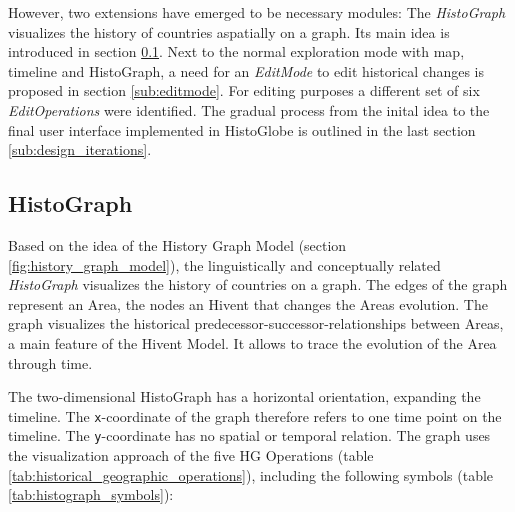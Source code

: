 However, two extensions have emerged to be necessary modules: The \emph{HistoGraph} visualizes the history of countries aspatially on a graph. Its main idea is introduced in section \ref{sub:histograph}. Next to the normal exploration mode with map, timeline and HistoGraph, a need for an \emph{EditMode} to edit historical changes is proposed in section \ref{sub:editmode}. For editing purposes a different set of six \emph{EditOperations} were identified. The gradual process from the inital idea to the final user interface implemented in HistoGlobe is outlined in the last section \ref{sub:design_iterations}.

\subsection{HistoGraph} %
\label{sub:histograph}

Based on the idea of the History Graph Model (section \ref{fig:history_graph_model}), the linguistically and conceptually related \emph{HistoGraph} visualizes the history of countries on a graph. The edges of the graph represent an Area, the nodes an Hivent that changes the Areas evolution. The graph visualizes the historical predecessor-successor-relationships between Areas, a main feature of the Hivent Model. It allows to trace the evolution of the Area through time.

The two-dimensional HistoGraph has a horizontal orientation, expanding the timeline. The \texttt{x}-coordinate of the graph therefore refers to one time point on the timeline. The \texttt{y}-coordinate has no spatial or temporal relation. The graph uses the visualization approach of the five HG Operations (table \ref{tab:historical_geographic_operations}), including the following symbols (table \ref{tab:histograph_symbols}):

